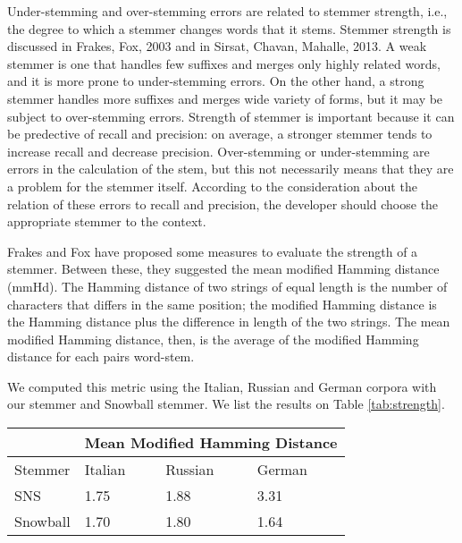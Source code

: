 Under-stemming and over-stemming errors are related to stemmer strength, i.e., the degree to which a stemmer changes words that it stems. Stemmer strength is discussed in Frakes, Fox, 2003\cite{frakes} and in Sirsat, Chavan, Mahalle, 2013\cite{sirsat}. A weak stemmer is one that handles few suffixes and merges only highly related words, and it is more prone to under-stemming errors. On the other hand, a strong stemmer handles more suffixes and merges wide variety of forms, but it may be subject to over-stemming errors. Strength of stemmer is important because it can be
predective %
of recall and precision: on average, a stronger stemmer tends to increase recall and decrease precision. Over-stemming or under-stemming are errors in the calculation of the stem, but this not necessarily means that they are a problem for the stemmer itself. According to the consideration about the relation of these errors to recall and precision, the developer should choose the appropriate stemmer to the context. 

Frakes and Fox have proposed some measures to evaluate the strength of a stemmer. Between these, they suggested the mean modified Hamming distance (mmHd). The Hamming distance of two strings of equal length is the number of characters that differs in the same position; the modified Hamming distance is the Hamming distance plus the difference in length of the two strings. The mean modified Hamming distance, then, is the average of the modified Hamming distance for each pairs word-stem.

We computed this metric using the Italian, Russian and German corpora with our stemmer and Snowball stemmer. We list the results on Table \ref{tab:strength}.

\begin{center}
   \begin{tabular}{| l | l | l | l |}
    \hline
    & \multicolumn{3}{l|}{\textbf{Mean Modified Hamming Distance}}\\ \hline
    Stemmer & Italian & Russian & German\\ \hline
    SNS & 1.75 & 1.88 & 3.31 \\ \hline
    Snowball & 1.70 & 1.80 & 1.64\\ \hline    
    \end{tabular}
    \label{tab:strength}
\end{center}

